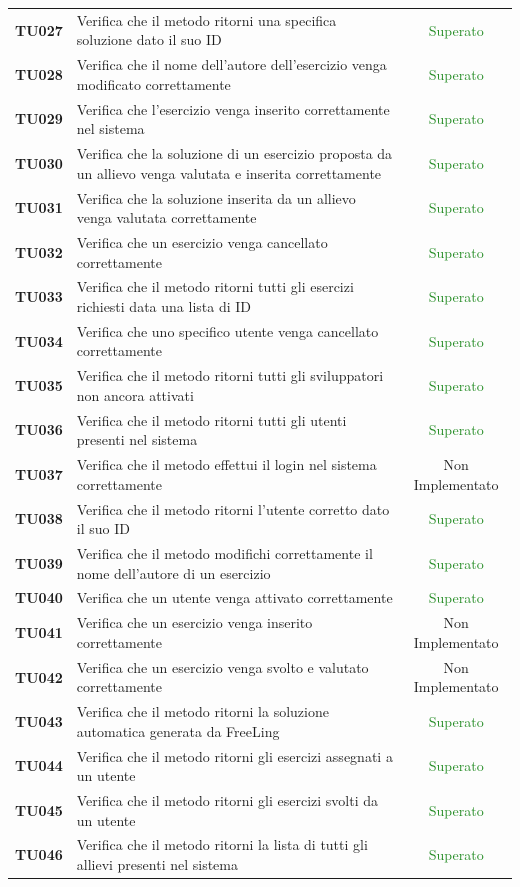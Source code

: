 \begin{tabularx}{\textwidth}{cXc}
	\textbf{TU027} & Verifica che il metodo ritorni una specifica soluzione dato il suo ID & \textcolor{ForestGreen}{Superato} \\
	\textbf{TU028} & Verifica che il nome dell'autore dell'esercizio venga modificato correttamente & \textcolor{ForestGreen}{Superato} \\
	\textbf{TU029} & Verifica che l'esercizio venga inserito correttamente nel sistema & \textcolor{ForestGreen}{Superato} \\
	\textbf{TU030} & Verifica che la soluzione di un esercizio proposta da un allievo venga valutata e inserita correttamente & \textcolor{ForestGreen}{Superato} \\
	\textbf{TU031} & Verifica che la soluzione inserita da un allievo venga valutata correttamente & \textcolor{ForestGreen}{Superato} \\
	\textbf{TU032} & Verifica che un esercizio venga cancellato correttamente & \textcolor{ForestGreen}{Superato} \\
	\textbf{TU033} & Verifica che il metodo ritorni tutti gli esercizi richiesti data una lista di ID & \textcolor{ForestGreen}{Superato} \\
	\textbf{TU034} & Verifica che uno specifico utente venga cancellato correttamente & \textcolor{ForestGreen}{Superato} \\
	\textbf{TU035} & Verifica che il metodo ritorni tutti gli sviluppatori non ancora attivati & \textcolor{ForestGreen}{Superato} \\
	\textbf{TU036} & Verifica che il metodo ritorni tutti gli utenti presenti nel sistema & \textcolor{ForestGreen}{Superato} \\
	\textbf{TU037} & Verifica che il metodo effettui il login nel sistema correttamente & Non Implementato \\
	\textbf{TU038} & Verifica che il metodo ritorni l'utente corretto dato il suo ID & \textcolor{ForestGreen}{Superato} \\
	\textbf{TU039} & Verifica che il metodo modifichi correttamente il nome dell'autore di un esercizio & \textcolor{ForestGreen}{Superato} \\
	\textbf{TU040} & Verifica che un utente venga attivato correttamente & \textcolor{ForestGreen}{Superato} \\
	\textbf{TU041} & Verifica che un esercizio venga inserito correttamente & Non Implementato \\
	\textbf{TU042} & Verifica che un esercizio venga svolto e valutato correttamente & Non Implementato \\
	\textbf{TU043} & Verifica che il metodo ritorni la soluzione automatica generata da FreeLing & \textcolor{ForestGreen}{Superato} \\
	\textbf{TU044} & Verifica che il metodo ritorni gli esercizi assegnati a un utente & \textcolor{ForestGreen}{Superato} \\
	\textbf{TU045} & Verifica che il metodo ritorni gli esercizi svolti da un utente & \textcolor{ForestGreen}{Superato} \\
	\textbf{TU046} & Verifica che il metodo ritorni la lista di tutti gli allievi presenti nel sistema & \textcolor{ForestGreen}{Superato} \\
	

\end{tabularx}
